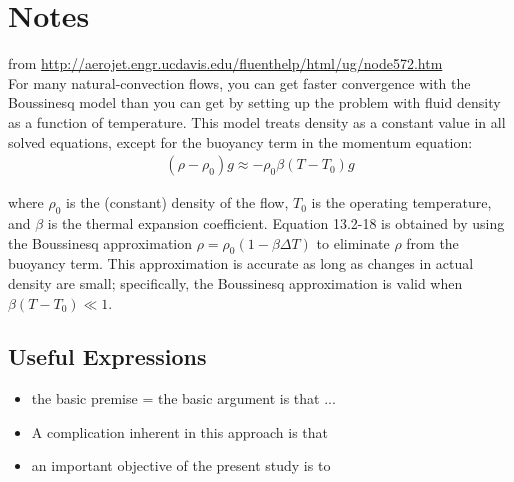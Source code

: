 \chapter{Notes}

from \url{http://aerojet.engr.ucdavis.edu/fluenthelp/html/ug/node572.htm} \\

For many natural-convection flows, you can get faster convergence with the Boussinesq model than 
you can get by setting up the problem with fluid density as a function of temperature. This model 
treats density as a constant value in all solved equations, except for the buoyancy term in the momentum 
equation:
\begin{align}
 (\rho - \rho_0) g \approx -\rho_0 \beta (T - T_0) g 	
\end{align}

where  $\rho_0$ is the (constant) density of the flow,  $T_0$ is the operating temperature, and  $\beta$ is 
the thermal expansion coefficient. Equation  13.2-18 is obtained by using the Boussinesq approximation  
$\rho = \rho_0 (1 - \beta \Delta T)$ to eliminate  $\rho$ from the buoyancy term. This approximation is accurate as 
long as changes in actual density are small; specifically, the Boussinesq approximation is valid when  $\beta(T-T_0)\ll 1$.


\section{Useful Expressions}
\begin{itemize}
\item  the basic premise = the basic argument is that ...
\item A complication inherent in this approach is that
\item an important objective of the present study is to
\end{itemize}
